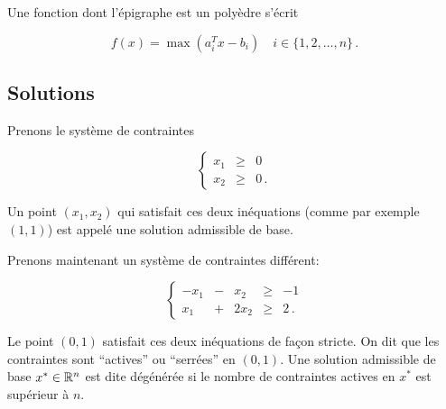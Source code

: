 	Une fonction dont l'épigraphe est un polyèdre s'écrit

	\[
	f(x) = \max \left( a_i^T x - b_i \right)
	\quad i \in \{1,2,\dots,n\}\,.
	\]

\subsection{Solutions}

	Prenons le système de contraintes

	\[
	\renewcommand{\arraystretch}{1.5}
	\left\{
	\begin{array}{rcl}
		x_1 & \ge & 0\\
		x_2 & \ge & 0\,.
	\end{array}
	\right.
	\]

	Un point $(x_1,x_2)$ qui satisfait ces deux inéquations
	(comme par exemple $(1,1)$)
	est appelé une solution admissible de base.

	Prenons maintenant un système de contraintes différent:

	\[
	\renewcommand{\arraystretch}{1.5}
	\left\{
	\begin{array}{rcrcr}
		-x_1 & - & x_2  & \ge & -1\\
		 x_1 & + & 2x_2 & \ge &  2\,.
	\end{array}
	\right.
	\]

	Le point $(0,1)$ satisfait ces deux inéquations
	de façon stricte.
	On dit que les contraintes sont ``actives'' ou ``serrées'' en $(0,1)$.
	Une solution admissible de base $x^* \in \mathbb{R}^n$ est dite dégénérée
	si le nombre de contraintes actives
	en $x^*$ est supérieur à $n$.

	\begin{center}
	\end{center}

